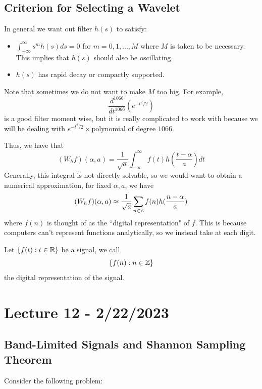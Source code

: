\documentclass{article}
\begin{document}
\subsection{Criterion for Selecting a Wavelet}

In general we want out filter $h(s)$ to satisfy:
\begin{itemize}
    \item $\int_{-\infty}^\infty s^m h(s) ds = 0$ for $m = 0, 1, ..., M$ where $M$ is taken to be necessary. This implies that $h(s)$ should also be oscillating.
    \item $h(s)$ has rapid decay or compactly supported.
\end{itemize}

Note that sometimes we do not want to make $M$ too big. For example,
\[\frac{d^{1066}}{d t^{1066}} (e^{-t^2/2})\]
is a good filter moment wise, but it is really complicated to work with because we will be dealing with $e^{-t^2/2} \times \text{polynomial of degree $1066$}$.

Thus, we have that
\[(W_h f)(\alpha, a) = \frac{1}{\sqrt{a}} \int_{-\infty}^\infty f(t) h(\frac{t - \alpha}{a}) dt\]
Generally, this integral is not directly solvable, so we would want to obtain a numerical approximation, for fixed $\alpha, a$, we have
\[(W_h f)(\alpha, a) \approx \frac{1}{\sqrt{a}} \sum_{n \in \mathbb{Z}} f(n) h(\frac{n - \alpha}{a})\]
where $f(n)$ is thought of as the ``digital representation" of $f$. This is because computers can't represent functions analytically, so we instead take at each digit.

\begin{definition}
    Let $\{f(t): t \in \mathbb{R}\}$ be a signal, we call
    \[\{f(n): n \in \mathbb{Z}\}\]
    the digital representation of the signal.
\end{definition}

\newpage

\section{Lecture 12 - 2/22/2023}

\subsection{Band-Limited Signals and Shannon Sampling Theorem}

Consider the following problem:
\end{document}
